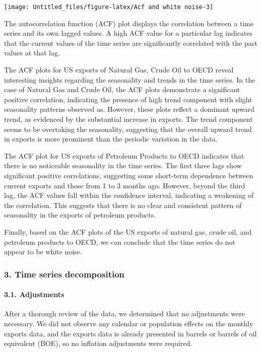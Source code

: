 \documentclass[
]{article}
\begin{document}
\begin{center}\texttt{[image: Untitled\_files/figure-latex/Acf and white noise-3]} \end{center}

The autocorrelation function (ACF) plot displays the correlation between
a time series and its own lagged values. A high ACF value for a
particular lag indicates that the current values of the time series are
significantly correlated with the past values at that lag.

The ACF plots for US exports of Natural Gas, Crude Oil to OECD reveal
interesting insights regarding the seasonality and trends in the time
series. In the case of Natural Gas and Crude Oil, the ACF plots
demonstrate a significant positive correlation, indicating the presence
of high trend component with slight seasonality patterns observed as.
However, these plots reflect a dominant upward trend, as evidenced by
the substantial increase in exports. The trend component seems to be
overtaking the seasonality, suggesting that the overall upward trend in
exports is more prominent than the periodic variation in the data.

The ACF plot for US exports of Petroleum Products to OECD indicates that
there is no noticeable seasonality in the time series. The first three
lags show significant positive correlations, suggesting some short-term
dependence between current exports and those from 1 to 3 months ago.
However, beyond the third lag, the ACF values fall within the confidence
interval, indicating a weakening of the correlation. This suggests that
there is no clear and consistent pattern of seasonality in the exports
of petroleum products.

Finally, based on the ACF plots of the US exports of natural gas, crude
oil, and petroleum products to OECD, we can conclude that the time
series do not appear to be white noise.

\hypertarget{time-series-decomposition}{%
\subsubsection{3. Time series
decomposition}\label{time-series-decomposition}}

\hypertarget{adjustments}{%
\paragraph{3.1. Adjustments}\label{adjustments}}

After a thorough review of the data, we determined that no adjustments
were necessary. We did not observe any calendar or population effects on
the monthly exports data, and the exports data is already presented in
barrels or barrels of oil equivalent (BOE), so no inflation adjustments
were required.
\end{document}
